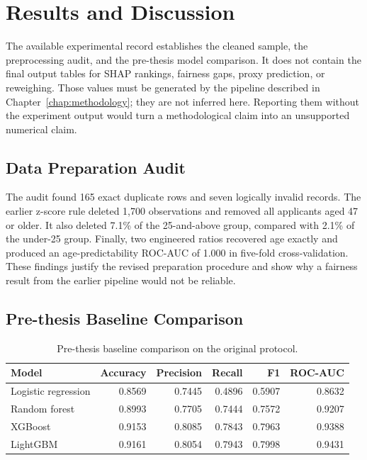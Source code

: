 \chapter{Results and Discussion}
\label{chap:results}

The available experimental record establishes the cleaned sample, the
preprocessing audit, and the pre-thesis model comparison. It does not contain
the final output tables for SHAP rankings, fairness gaps, proxy prediction, or
reweighing. Those values must be generated by the pipeline described in
Chapter~\ref{chap:methodology}; they are not inferred here. Reporting them
without the experiment output would turn a methodological claim into an
unsupported numerical claim.

\section{Data Preparation Audit}

The audit found 165 exact duplicate rows and seven logically invalid records.
The earlier z-score rule deleted 1,700 observations and removed all applicants
aged 47 or older. It also deleted 7.1\% of the 25-and-above group, compared
with 2.1\% of the under-25 group. Finally, two engineered ratios recovered age
exactly and produced an age-predictability ROC-AUC of 1.000 in five-fold
cross-validation. These findings justify the revised preparation procedure and
show why a fairness result from the earlier pipeline would not be reliable.

\section{Pre-thesis Baseline Comparison}

\begin{table}[H]
\centering
\caption{Pre-thesis baseline comparison on the original protocol.}
\label{tab:baseline-results}
\begin{tabular}{lrrrrr}
\toprule
\textbf{Model} & \textbf{Accuracy} & \textbf{Precision} & \textbf{Recall}
& \textbf{F1} & \textbf{ROC-AUC}\\
\midrule
Logistic regression & 0.8569 & 0.7445 & 0.4896 & 0.5907 & 0.8632\\
Random forest & 0.8993 & 0.7705 & 0.7444 & 0.7572 & 0.9207\\
XGBoost & 0.9153 & 0.8085 & 0.7843 & 0.7963 & 0.9388\\
LightGBM & 0.9161 & 0.8054 & 0.7943 & 0.7998 & 0.9431\\
\bottomrule
\end{tabular}
\end{table}

